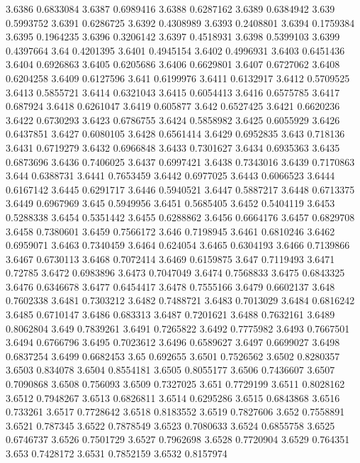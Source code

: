 3.6386  0.6833084
3.6387  0.6989416
3.6388  0.6287162
3.6389  0.6384942
3.639  0.5993752
3.6391  0.6286725
3.6392  0.4308989
3.6393  0.2408801
3.6394  0.1759384
3.6395  0.1964235
3.6396  0.3206142
3.6397  0.4518931
3.6398  0.5399103
3.6399  0.4397664
3.64  0.4201395
3.6401  0.4945154
3.6402  0.4996931
3.6403  0.6451436
3.6404  0.6926863
3.6405  0.6205686
3.6406  0.6629801
3.6407  0.6727062
3.6408  0.6204258
3.6409  0.6127596
3.641  0.6199976
3.6411  0.6132917
3.6412  0.5709525
3.6413  0.5855721
3.6414  0.6321043
3.6415  0.6054413
3.6416  0.6575785
3.6417  0.687924
3.6418  0.6261047
3.6419  0.605877
3.642  0.6527425
3.6421  0.6620236
3.6422  0.6730293
3.6423  0.6786755
3.6424  0.5858982
3.6425  0.6055929
3.6426  0.6437851
3.6427  0.6080105
3.6428  0.6561414
3.6429  0.6952835
3.643  0.718136
3.6431  0.6719279
3.6432  0.6966848
3.6433  0.7301627
3.6434  0.6935363
3.6435  0.6873696
3.6436  0.7406025
3.6437  0.6997421
3.6438  0.7343016
3.6439  0.7170863
3.644  0.6388731
3.6441  0.7653459
3.6442  0.6977025
3.6443  0.6066523
3.6444  0.6167142
3.6445  0.6291717
3.6446  0.5940521
3.6447  0.5887217
3.6448  0.6713375
3.6449  0.6967969
3.645  0.5949956
3.6451  0.5685405
3.6452  0.5404119
3.6453  0.5288338
3.6454  0.5351442
3.6455  0.6288862
3.6456  0.6664176
3.6457  0.6829708
3.6458  0.7380601
3.6459  0.7566172
3.646  0.7198945
3.6461  0.6810246
3.6462  0.6959071
3.6463  0.7340459
3.6464  0.624054
3.6465  0.6304193
3.6466  0.7139866
3.6467  0.6730113
3.6468  0.7072414
3.6469  0.6159875
3.647  0.7119493
3.6471  0.72785
3.6472  0.6983896
3.6473  0.7047049
3.6474  0.7568833
3.6475  0.6843325
3.6476  0.6346678
3.6477  0.6454417
3.6478  0.7555166
3.6479  0.6602137
3.648  0.7602338
3.6481  0.7303212
3.6482  0.7488721
3.6483  0.7013029
3.6484  0.6816242
3.6485  0.6710147
3.6486  0.683313
3.6487  0.7201621
3.6488  0.7632161
3.6489  0.8062804
3.649  0.7839261
3.6491  0.7265822
3.6492  0.7775982
3.6493  0.7667501
3.6494  0.6766796
3.6495  0.7023612
3.6496  0.6589627
3.6497  0.6699027
3.6498  0.6837254
3.6499  0.6682453
3.65  0.692655
3.6501  0.7526562
3.6502  0.8280357
3.6503  0.834078
3.6504  0.8554181
3.6505  0.8055177
3.6506  0.7436607
3.6507  0.7090868
3.6508  0.756093
3.6509  0.7327025
3.651  0.7729199
3.6511  0.8028162
3.6512  0.7948267
3.6513  0.6826811
3.6514  0.6295286
3.6515  0.6843868
3.6516  0.733261
3.6517  0.7728642
3.6518  0.8183552
3.6519  0.7827606
3.652  0.7558891
3.6521  0.787345
3.6522  0.7878549
3.6523  0.7080633
3.6524  0.6855758
3.6525  0.6746737
3.6526  0.7501729
3.6527  0.7962698
3.6528  0.7720904
3.6529  0.764351
3.653  0.7428172
3.6531  0.7852159
3.6532  0.8157974
